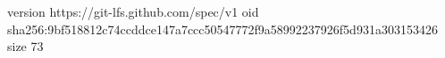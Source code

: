 version https://git-lfs.github.com/spec/v1
oid sha256:9bf518812c74ccddce147a7ccc50547772f9a58992237926f5d931a303153426
size 73
